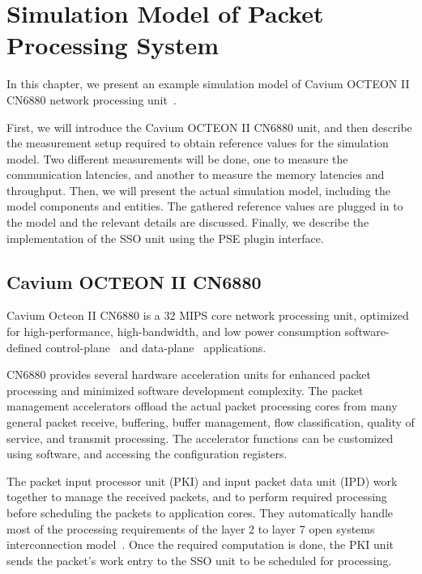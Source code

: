\chapter{Simulation Model of Packet Processing System}
\label{chapter:example-simulation-model}

In this chapter, we present an example simulation model of Cavium OCTEON II CN6880 network processing unit~\cite{Cavium OCTEON}.

First, we will introduce the Cavium OCTEON II CN6880 unit, and then describe the measurement setup required to obtain reference values for the simulation model. Two different measurements will be done, one to measure the communication latencies, and another to measure the memory latencies and throughput. Then, we will present the actual simulation model, including the model components and entities. The gathered reference values are plugged in to the model and the relevant details are discussed. Finally, we describe the implementation of the SSO unit using the PSE plugin interface.

\section{Cavium OCTEON II CN6880}
\label{sec:cavium-octeon}


Cavium Octeon II CN6880 is a 32 MIPS core network processing unit, optimized for high-performance, high-bandwidth, and low power consumption software-defined control-plane~\cite{control-plane} and data-plane~\cite{data-plane} applications.

CN6880 provides several hardware acceleration units for enhanced packet processing and minimized software development complexity. The packet management accelerators offload the actual packet processing cores from many general packet receive, buffering, buffer management, flow classification, quality of service, and transmit processing. The accelerator functions can be customized using software, and accessing the configuration registers.~\cite{cavium:2010:fundamentals}

The packet input processor unit (PKI) and input packet data unit (IPD) work together to manage the received packets, and to perform required processing before scheduling the packets to application cores. They automatically handle most of the processing requirements of the layer 2 to layer 7 open systems interconnection model~\cite{OSI model}. Once the required computation is done, the PKI unit sends the packet's work entry to the SSO unit to be scheduled for processing.~\cite{cavium:2010:fundamentals}

